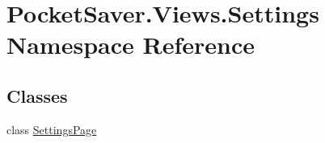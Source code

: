 \hypertarget{namespace_pocket_saver_1_1_views_1_1_settings}{}\section{Pocket\+Saver.\+Views.\+Settings Namespace Reference}
\label{namespace_pocket_saver_1_1_views_1_1_settings}
\subsection*{Classes}
\begin{DoxyCompactItemize}
\item 
class \hyperlink{class_pocket_saver_1_1_views_1_1_settings_1_1_settings_page}{Settings\+Page}
\end{DoxyCompactItemize}
